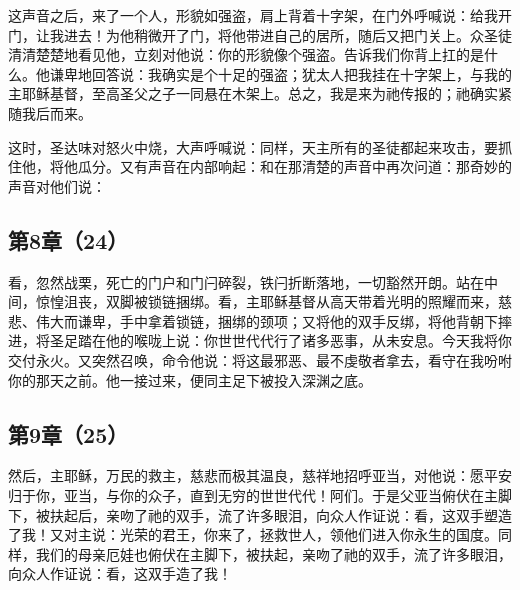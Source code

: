 这声音之后，来了一个人，形貌如强盗，肩上背着十字架，在门外呼喊说：给我开门，让我进去！为他稍微开了门，将他带进自己的居所，随后又把门关上。众圣徒清清楚楚地看见他，立刻对他说：你的形貌像个强盗。告诉我们你背上扛的是什么。他谦卑地回答说：我确实是个十足的强盗；犹太人把我挂在十字架上，与我的主耶稣基督，至高圣父之子一同悬在木架上。总之，我是来为祂传报的；祂确实紧随我后而来。\par

这时，圣达味对怒火中烧，大声呼喊说：同样，天主所有的圣徒都起来攻击，要抓住他，将他瓜分。又有声音在内部响起：和在那清楚的声音中再次问道：那奇妙的声音对他们说：\par


\subsection{第8章（24）}

看，忽然战栗，死亡的门户和门闩碎裂，铁闩折断落地，一切豁然开朗。站在中间，惊惶沮丧，双脚被锁链捆绑。看，主耶稣基督从高天带着光明的照耀而来，慈悲、伟大而谦卑，手中拿着锁链，捆绑的颈项；又将他的双手反绑，将他背朝下摔进，将圣足踏在他的喉咙上说：你世世代代行了诸多恶事，从未安息。今天我将你交付永火。又突然召唤，命令他说：将这最邪恶、最不虔敬者拿去，看守在我吩咐你的那天之前。他一接过来，便同主足下被投入深渊之底。\par


\subsection{第9章（25）}

然后，主耶稣，万民的救主，慈悲而极其温良，慈祥地招呼亚当，对他说：愿平安归于你，亚当，与你的众子，直到无穷的世世代代！阿们。于是父亚当俯伏在主脚下，被扶起后，亲吻了祂的双手，流了许多眼泪，向众人作证说：看，这双手塑造了我！又对主说：光荣的君王，你来了，拯救世人，领他们进入你永生的国度。同样，我们的母亲厄娃也俯伏在主脚下，被扶起，亲吻了祂的双手，流了许多眼泪，向众人作证说：看，这双手造了我！\par

